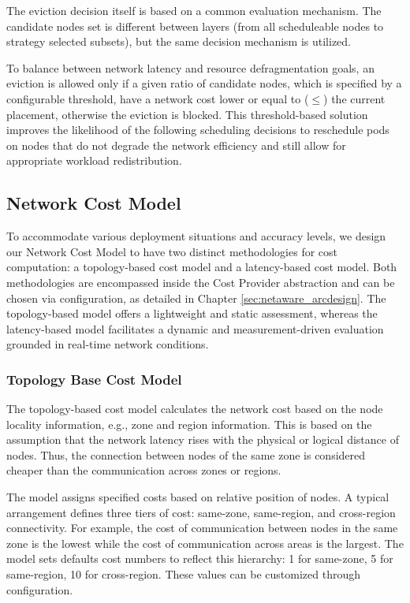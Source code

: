 The eviction decision itself is based on a common evaluation mechanism. The candidate nodes set is different between layers (from all scheduleable nodes to strategy selected subsets), but the same decision mechanism is utilized.

To balance between network latency and resource defragmentation goals, an eviction is allowed only if a given ratio of candidate nodes, which is specified by a configurable threshold, have a network cost lower or equal to ($\leq$) the current placement, otherwise the eviction is blocked. This threshold-based solution improves the likelihood of the following scheduling decisions to reschedule pods on nodes that do not degrade the network efficiency and still allow for appropriate workload redistribution.

\subsection{Network Cost Model}
\label{sec:netaware_costmodel}
To accommodate various deployment situations and accuracy levels, we design our Network Cost Model to have two distinct methodologies for cost computation: a topology-based cost model and a latency-based cost model. Both methodologies are encompassed inside the Cost Provider abstraction and can be chosen via configuration, as detailed in Chapter \ref{sec:netaware_arcdesign}. The topology-based model offers a lightweight and static assessment, whereas the latency-based model facilitates a dynamic and measurement-driven evaluation grounded in real-time network conditions.
\subsubsection{Topology Base Cost Model}
\label{sec:netaware_topologycostmodel}
The topology-based cost model calculates the network cost based on the node locality information, e.g., zone and region information. This is based on the assumption that the network latency rises with the physical or logical distance of nodes. Thus, the connection between nodes of the same zone is considered cheaper than the communication across zones or regions.

The model assigns specified costs based on relative position of nodes. A typical arrangement defines three tiers of cost: same-zone, same-region, and cross-region connectivity. For example, the cost of communication between nodes in the same zone is the lowest while the cost of communication across areas is the largest. The model sets defaults cost numbers to reflect this hierarchy: 1 for same-zone, 5 for same-region, 10 for cross-region. These values can be customized through configuration.

